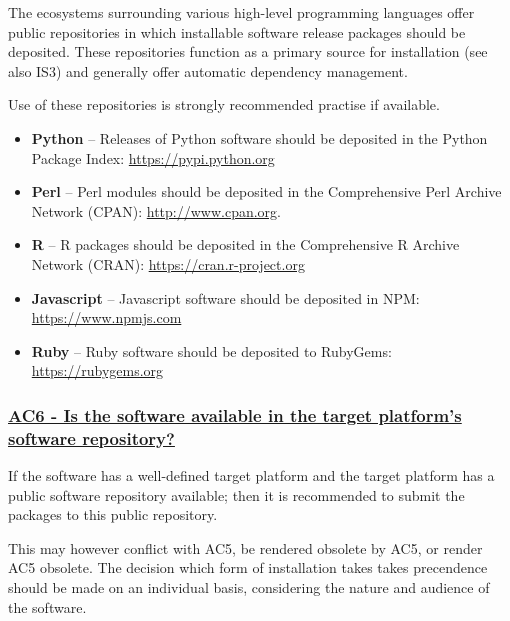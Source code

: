 \documentclass[a4paper,11pt]{article}
\newcommand{\indicator}[1]{\subsubsection*{\underline{#1}}}
\begin{document}
The ecosystems surrounding various high-level programming languages offer
public repositories in which installable software release packages should be
deposited. These repositories function as a primary source for installation (see also
IS3) and generally offer automatic dependency management.

Use of these repositories is strongly recommended practise if available.

\begin{itemize}
    \item \textbf{Python} -- Releases of Python software should be deposited in
        the Python Package Index: \url{https://pypi.python.org}
    \item \textbf{Perl} --  Perl modules should be deposited in the Comprehensive
        Perl Archive Network (CPAN): \url{http://www.cpan.org}.
    \item \textbf{R} -- R packages should be deposited in the Comprehensive R
        Archive Network (CRAN): \url{https://cran.r-project.org}
    \item \textbf{Javascript} -- Javascript software should be deposited in
        NPM: \url{https://www.npmjs.com}
    \item \textbf{Ruby} -- Ruby software should be deposited to 
        RubyGems: \url{https://rubygems.org}
\end{itemize}

\indicator{AC6 - Is the software available in the target platform's software repository?}

If the software has a well-defined target platform and the target platform has
a public software repository available; then it is recommended to submit the
packages to this public repository.

This may however conflict with AC5, be rendered obsolete by AC5, or render AC5
obsolete. The decision which form of installation takes takes precendence should be
made on an individual basis, considering the nature and audience of the
software.
\end{document}
